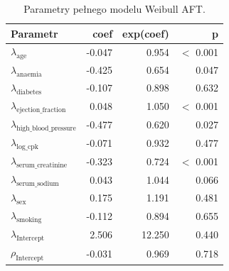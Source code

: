 \begin{table}[htbp]
\centering
\caption{Parametry pełnego modelu Weibull AFT.}
\label{tab:aft-best}
\scriptsize
\setlength{\tabcolsep}{1.5pt}
\begin{tabular}{lrrr}
\toprule
Parametr & coef & exp(coef) & p \\
\midrule
$\lambda_{\mathrm{age}}$ & -0.047 & 0.954 & $<$ 0.001 \\
$\lambda_{\mathrm{anaemia}}$ & -0.425 & 0.654 & 0.047 \\
$\lambda_{\mathrm{diabetes}}$ & -0.107 & 0.898 & 0.632 \\
$\lambda_{\mathrm{ejection\_fraction}}$ & 0.048 & 1.050 & $<$ 0.001 \\
$\lambda_{\mathrm{high\_blood\_pressure}}$ & -0.477 & 0.620 & 0.027 \\
$\lambda_{\mathrm{log\_cpk}}$ & -0.071 & 0.932 & 0.477 \\
$\lambda_{\mathrm{serum\_creatinine}}$ & -0.323 & 0.724 & $<$ 0.001 \\
$\lambda_{\mathrm{serum\_sodium}}$ & 0.043 & 1.044 & 0.066 \\
$\lambda_{\mathrm{sex}}$ & 0.175 & 1.191 & 0.481 \\
$\lambda_{\mathrm{smoking}}$ & -0.112 & 0.894 & 0.655 \\
$\lambda_{\mathrm{Intercept}}$ & 2.506 & 12.250 & 0.440 \\
$\rho_{\mathrm{Intercept}}$ & -0.031 & 0.969 & 0.718 \\
\bottomrule
\end{tabular}
\end{table}
